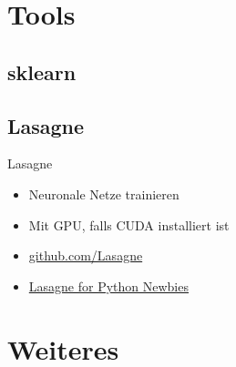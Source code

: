 \section{Tools}
\subsection{sklearn}

\subsection{Lasagne}
\begin{frame}{Lasagne}
    \begin{itemize}
        \item Neuronale Netze trainieren
        \item Mit GPU, falls CUDA installiert ist
        \item \href{https://github.com/Lasagne/Lasagne}{github.com/Lasagne}
        \item \href{http://martin-thoma.com/lasagne-for-python-newbies}{Lasagne for Python Newbies}
    \end{itemize}
\end{frame}


\section{Weiteres}

